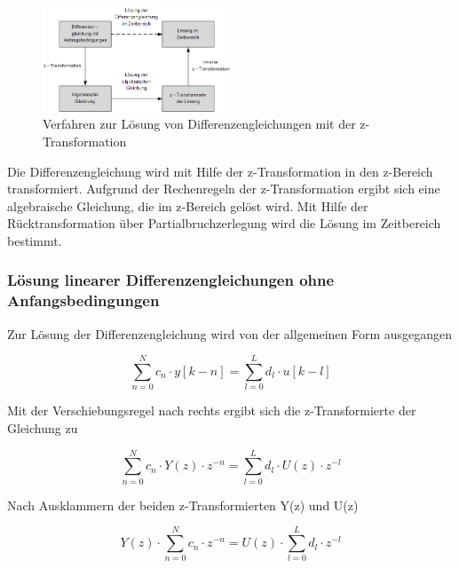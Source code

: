 \begin{figure}[H]
  \centerline{\includegraphics[width=0.5\textwidth]{Kapitel6/Bilder/image1.png}}
  \caption{Verfahren zur L\"{o}sung von Differenzengleichungen mit der z-Transformation}
  \label{fig:LoesungDGLImZBereich}
\end{figure}

\noindent Die Differenzengleichung wird mit Hilfe der z-Transformation in den z-Bereich transformiert. Aufgrund der Rechenregeln der z-Transformation ergibt sich eine algebraische Gleichung, die im z-Bereich gel\"{o}st wird. Mit Hilfe der R\"{u}cktransformation \"{u}ber Partialbruchzerlegung wird die L\"{o}sung im Zeitbereich bestimmt.

\subsubsection{L\"{o}sung linearer Differenzengleichungen ohne Anfangsbedingungen}

\noindent Zur L\"{o}sung der Differenzengleichung wird von der allgemeinen Form ausgegangen

\begin{equation}\label{eq:sixone}
\sum _{n=0}^{N}c_{n} \cdot y\left[k-n\right] =\sum _{l=0}^{L}d_{l} \cdot u\left[k-l\right]
\end{equation}

\noindent Mit der Verschiebungsregel nach rechts ergibt sich die z-Transformierte der Gleichung zu

\begin{equation}\label{eq:sixtwo}
\sum _{n=0}^{N}c_{n} \cdot Y\left(z\right)\cdot z^{-n}  =\sum _{l=0}^{L}d_{l} \cdot U\left(z\right)\cdot z^{-l}
\end{equation}

\noindent Nach Ausklammern der beiden z-Transformierten Y(z) und U(z)

\begin{equation}\label{eq:sixthree}
Y\left(z\right)\cdot \sum _{n=0}^{N}c_{n} \cdot z^{-n}  =U\left(z\right)\cdot \sum _{l=0}^{L}d_{l} \cdot z^{-l}
\end{equation}


